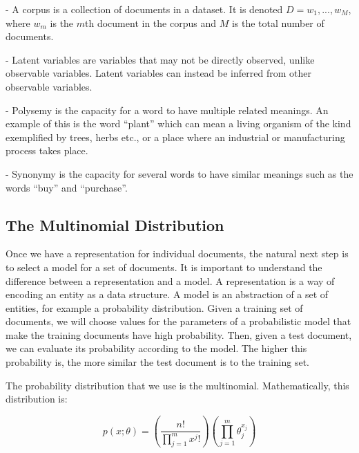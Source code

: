 \documentclass[12pt]{report}
\begin{document}
- A corpus is a collection of documents in a dataset. It is denoted $D = {w_1, ..., w_M}$, where $w_m$ is the $m$th document in the corpus and $M$ is the total number of documents.

- Latent variables are variables that may not be directly observed, unlike observable variables. Latent variables can instead be inferred from other observable variables.

- Polysemy is the capacity for a word to have multiple related meanings. An example of this is the word “plant” which can mean a living organism of the kind exemplified by trees, herbs etc., or a place where an industrial or manufacturing process takes place.

- Synonymy is the capacity for several words to have similar meanings such as the words “buy” and “purchase”.

\vspace{10mm}

\subsection{The Multinomial Distribution}

\vspace{5mm}

Once we have a representation for individual documents, the natural next step is to select a model for a set of documents. It is important to understand the difference between a representation and a model.  A representation is a way of encoding an entity as a data structure. A model is an abstraction of a set of entities, for example a probability distribution.  Given a training set of documents, we will choose values for the parameters of a probabilistic model that make the training documents have high probability. Then, given a test document, we can evaluate its probability according to the model. The higher this probability is, the more similar the test document is to the training set. 

\vspace{3mm} 

The probability distribution that we use is the multinomial. Mathematically, this distribution is:

\begin{equation}
p(x;\theta) = \left(\frac{n!}{\prod\limits_{j=1}^m x^j!}\right)\left(\prod\limits_{j=1}^m \theta_j^{x_j}\right)
\end{equation}

\vspace{3mm}
\end{document}
